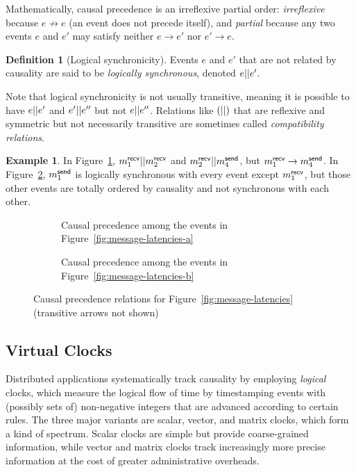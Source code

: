 \documentclass[]             %
{NASA}                       %
\theoremstyle{definition}
\newtheorem{example}[theorem]{Example}
\newtheorem{definition}[theorem]{Definition}
\begin{document}
Mathematically, causal precedence is an irreflexive partial order:
\emph{irreflexive} because $e \not \to e$ (an event does not precede
itself), and \emph{partial} because any two events $e$ and $e'$ may
satisfy neither $e \to e'$ nor $e' \to e$.

\begin{definition}[Logical synchronicity]
  \label{def:logically-synchronous}
  Events $e$ and $e'$ that are not related by causality are said to be
  \emph{logically synchronous}, denoted $e || e'$.
\end{definition}

Note that logical synchronicity is not usually transitive, meaning it
is possible to have $e || e'$ and $e' || e''$ but not
$e || e''$.  Relations like $\left(||\right)$ that are
reflexive and symmetric but not necessarily transitive are sometimes
called \emph{compatibility relations}.
\begin{example}
  \label{ex:synchronous-intransitive}
  In Figure~\ref{fig:message-co-a}, $m_{1}^{\mathsf{recv}} || m_{2}^{\mathsf{recv}}$ and
  $m_{2}^{\mathsf{recv}} || m_{4}^{\mathsf{send}}$, but $m_{1}^{\mathsf{recv}} \to m_{4}^{\mathsf{send}}$. In
  Figure~\ref{fig:message-co-b}, $m_{1}^{\mathsf{send}}$ is logically synchronous
  with every event except $m_{1}^{\mathsf{recv}}$, but those other events are
  totally ordered by causality and not synchronous with each other.
\end{example}

\begin{figure}
  \begingroup
  \setlength\belowcaptionskip{4ex}
  \begin{subfigure}{1\textwidth}
    \centering
    
    \caption{Causal precedence among the events in Figure~\ref{fig:message-latencies-a}}
    \label{fig:message-co-a}
  \end{subfigure}
  \endgroup
  \begin{subfigure}{1\textwidth}
    \centering
    
    \caption{Causal precedence among the events in Figure~\ref{fig:message-latencies-b}}
    \label{fig:message-co-b}
  \end{subfigure}
  \caption{Causal precedence relations for Figure~\ref{fig:message-latencies} (transitive arrows not shown)}
  \label{fig:causal-precedence}
\end{figure}

\subsection{Virtual Clocks}
\label{ssec:timestamps}
Distributed applications systematically track causality by employing
\emph{logical} clocks, which measure the logical flow of time by
timestamping events with (possibly sets of) non-negative integers that
are advanced according to certain rules. The three major variants are
scalar, vector, and matrix clocks, which form a kind of
spectrum. Scalar clocks are simple but provide coarse-grained
information, while vector and matrix clocks track increasingly more
precise information at the cost of greater administrative overheads.
\end{document}
